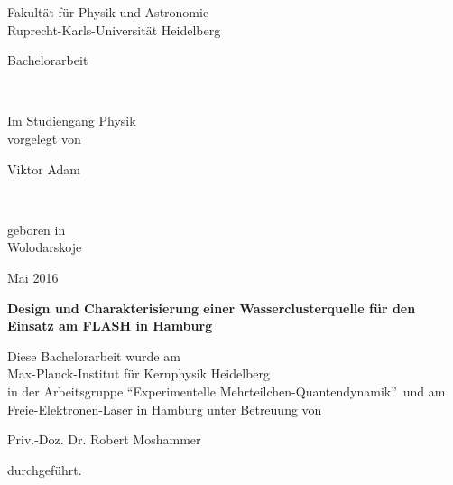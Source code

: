 
\thispagestyle{empty}
\begin{center}
  \renewcommand{\baselinestretch}{2.00}
  \Large\sffamily 
  Fakultät für Physik und Astronomie\\
  \large 
  Ruprecht-Karls-Universität Heidelberg
  \par\vfill\normalfont
  \begin{Large}Bachelorarbeit\end{Large}\\
\begin{normalsize}  Im Studiengang Physik\\
  vorgelegt von\\\end{normalsize}
  \begin{Large}Viktor Adam\end{Large}\\
\begin{normalsize}  geboren in\\
  Wolodarskoje \\\end{normalsize}
  \begin{Large}Mai 2016\end{Large}
\end{center}


\cleardoublepage
\thispagestyle{empty}

\begin{center}
  \renewcommand{\baselinestretch}{1.50}
  \Large\bfseries\sffamily
    Design und Charakterisierung einer Wasserclusterquelle für den Einsatz am FLASH in Hamburg\\
  \vfill
  \normalfont
\begin{normalsize}  Diese Bachelorarbeit wurde am \\
  Max-Planck-Institut für Kernphysik Heidelberg \\
  in der Arbeitsgruppe \enquote{Experimentelle Mehrteilchen-Quantendynamik}\ und am Freie-Elektronen-Laser in Hamburg unter Betreuung von \\\end{normalsize}
   Priv.-Doz. Dr. Robert Moshammer \\
 \begin{normalsize}  durchgeführt.\end{normalsize}
\end{center} %
\vspace{5\baselineskip}

\renewcommand{\baselinestretch}{1.00}\normalsize

\cleardoublepage

